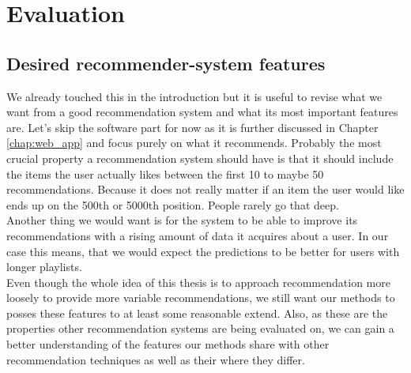 \section{Evaluation}

\subsection{Desired recommender-system features}
We already touched this in the introduction but it is useful to revise what we want from a good recommendation system and what its most important features are. Let's skip the software part for now as it is further discussed in Chapter \ref{chap:web_app} and focus purely on what it recommends. Probably the most crucial property a recommendation system should have is that it should include the items the user actually likes between the first 10 to maybe 50 recommendations. Because it does not really matter if an item the user would like ends up on the 500th or 5000th position. People rarely go that deep. \\
Another thing we would want is for the system to be able to improve its recommendations with a rising amount of data it acquires about a user. In our case this means, that we would expect the predictions to be better for users with longer playlists. \\
Even though the whole idea of this thesis is to approach recommendation more loosely to provide more variable recommendations, we still want our methods to posses these features to at least some reasonable extend. Also, as these are the properties other recommendation systems are being evaluated on, we can gain a better understanding of the features our methods share with other recommendation techniques as well as their where they differ. 

